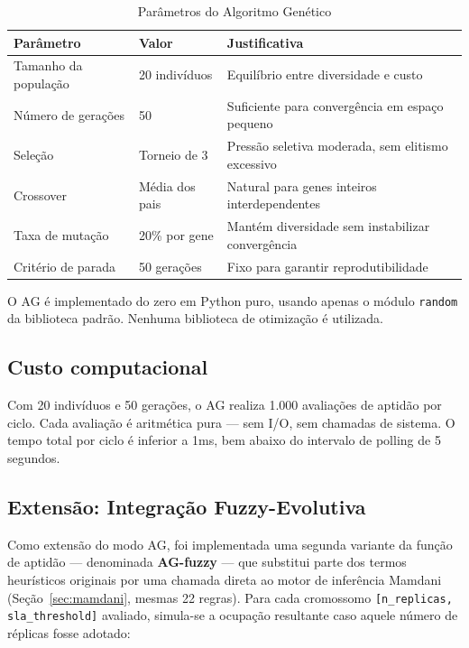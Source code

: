 \documentclass[12pt, a4paper]{article}
\begin{document}
\begin{table}[H]
  \centering
  \caption{Parâmetros do Algoritmo Genético}
  \label{tab:ag_params}
  \begin{tabular}{lll}
    \toprule
    \rowcolor{headerblue}
    \textbf{Parâmetro} & \textbf{Valor} & \textbf{Justificativa} \\
    \midrule
    Tamanho da população & 20 indivíduos & Equilíbrio entre diversidade e custo \\
    Número de gerações   & 50            & Suficiente para convergência em espaço pequeno \\
    Seleção              & Torneio de 3  & Pressão seletiva moderada, sem elitismo excessivo \\
    Crossover            & Média dos pais & Natural para genes inteiros interdependentes \\
    Taxa de mutação      & 20\% por gene  & Mantém diversidade sem instabilizar convergência \\
    Critério de parada   & 50 gerações   & Fixo para garantir reprodutibilidade \\
    \bottomrule
  \end{tabular}
\end{table}

O AG é implementado do zero em Python puro, usando apenas o módulo \texttt{random} da biblioteca padrão. Nenhuma biblioteca de otimização é utilizada.

\subsection{Custo computacional}

Com 20 indivíduos e 50 gerações, o AG realiza 1.000 avaliações de aptidão por ciclo. Cada avaliação é aritmética pura — sem I/O, sem chamadas de sistema. O tempo total por ciclo é inferior a 1ms, bem abaixo do intervalo de polling de 5 segundos.

\subsection{Extensão: Integração Fuzzy-Evolutiva}
\label{sec:fuzzy_ag}

Como extensão do modo AG, foi implementada uma segunda variante da função de aptidão — denominada \textbf{AG-fuzzy} — que substitui parte dos termos heurísticos originais por uma chamada direta ao motor de inferência Mamdani (Seção~\ref{sec:mamdani}, mesmas 22 regras). Para cada cromossomo \texttt{[n\_replicas, sla\_threshold]} avaliado, simula-se a ocupação resultante caso aquele número de réplicas fosse adotado:
\end{document}
